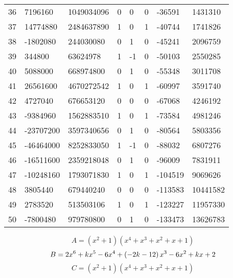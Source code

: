 \documentclass{amsart}
\begin{document}
\begin{longtable}{|l|l|l|lllll|}
36&7196160&1049034096&0&0&0&-36591&1431310\\
37&14774880&2484637890&1&0&1&-40744&1741826\\
38&-1802080&244030080&0&1&0&-45241&2096759\\
39&344800&63624978&1&-1&0&-50103&2550285\\
40&5088000&668974800&0&1&0&-55348&3011708\\
41&26561600&4670272542&1&0&1&-60997&3591740\\
42&4727040&676653120&0&0&0&-67068&4246192\\
43&-9384960&1562883510&1&0&1&-73584&4981246\\
44&-23707200&3597340656&0&1&0&-80564&5803356\\
45&-46464000&8252833050&1&-1&0&-88032&6807276\\
46&-16511600&2359218048&0&1&0&-96009&7831911\\
47&-10248160&1793071830&1&0&1&-104519&9069626\\
48&3805440&679440240&0&0&0&-113583&10441582\\
49&2783520&513503106&1&0&1&-123227&11957330\\
50&-7800480&979780800&0&1&0&-133473&13626783\\
\hline
\end{longtable}
$$A=(x^2
 + 1)(x^4
 + x^3
 + x^2
 + x
 + 1)$$
$$B=2\*x^6
 + k\*x^5
 - 6\*x^4
 + \left(-2\*k
 - 12\right) \*x^3
 - 6\*x^2
 + k\*x
 + 2$$
$$C=(x^2
 + 1)(x^4
 + x^3
 + x^2
 + x
 + 1)$$
\end{document}

